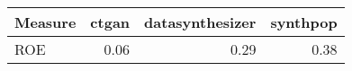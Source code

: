 \begin{tabular}{lrrr}
  \toprule
Measure & ctgan & datasynthesizer & synthpop \\ 
  \midrule
ROE & 0.06 & 0.29 & 0.38 \\ 
   \bottomrule
\end{tabular}

